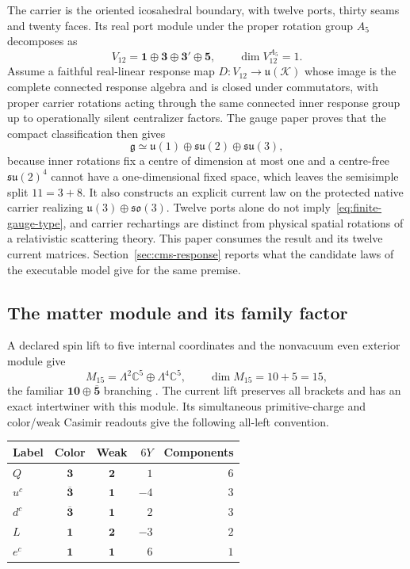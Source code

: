 \documentclass[11pt]{article}
\begin{document}
The carrier is the oriented icosahedral boundary, with twelve ports, thirty
seams and twenty faces. Its real port module under the proper rotation group
$A_5$ decomposes as
\[
 V_{12}=\mathbf1\oplus\mathbf3\oplus\mathbf3'\oplus\mathbf5,
 \qquad \dim V_{12}^{A_5}=1.
\]
Assume a faithful real-linear response map
$D:V_{12}\to\mathfrak u(\mathcal K)$ whose image is the complete connected
response algebra and is closed under commutators, with proper carrier rotations
acting through the same connected inner response group up to operationally
silent centralizer factors. The gauge paper \cite{ophGauge} proves that the
compact classification then gives
\begin{equation}
 \mathfrak g\simeq\mathfrak u(1)\oplus\mathfrak{su}(2)
                         \oplus\mathfrak{su}(3),
 \label{eq:finite-gauge-type}
\end{equation}
because inner rotations fix a centre of dimension at most one and a centre-free
$\mathfrak{su}(2)^4$ cannot have a one-dimensional fixed space, which leaves the
semisimple split $11=3+8$. It also constructs an explicit current law on the
protected native carrier realizing $\mathfrak u(3)\oplus\mathfrak{so}(3)$.
Twelve ports alone do not imply~\eqref{eq:finite-gauge-type}, and carrier
rechartings are distinct from physical spatial rotations of a relativistic
scattering theory. This paper consumes the result and its twelve current
matrices. Section~\ref{sec:cms-response} reports what the candidate laws
of the executable model give for the same premise.

\subsection{The matter module and its family factor}

A declared spin lift to five internal coordinates and the nonvacuum even
exterior module give
\[
 M_{15}=\Lambda^2\mathbb C^5\oplus\Lambda^4\mathbb C^5,
 \qquad \dim M_{15}=10+5=15,
\]
the familiar $\mathbf{10}\oplus\overline{\mathbf5}$ branching
\cite{georgiglashow1974}. The current lift preserves all brackets and has
an exact intertwiner with this module. Its simultaneous primitive-charge and
color/weak Casimir readouts give the following all-left convention.

\begin{center}
\begin{tabular}{@{}lccrr@{}}
\toprule
Label & Color & Weak & $6Y$ & Components\\
\midrule
$Q$ & $\mathbf3$ & $\mathbf2$ & $1$ & $6$\\
$u^c$ & $\overline{\mathbf3}$ & $\mathbf1$ & $-4$ & $3$\\
$d^c$ & $\overline{\mathbf3}$ & $\mathbf1$ & $2$ & $3$\\
$L$ & $\mathbf1$ & $\mathbf2$ & $-3$ & $2$\\
$e^c$ & $\mathbf1$ & $\mathbf1$ & $6$ & $1$\\
\bottomrule
\end{tabular}
\end{center}
\end{document}
